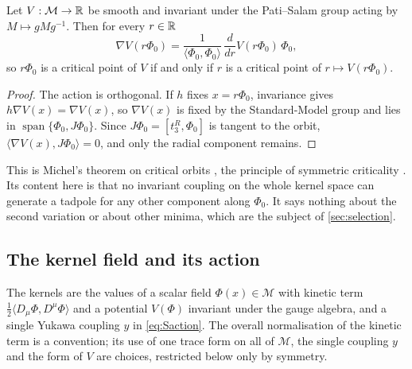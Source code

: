 \begin{theorem}
\label{thm:symcrit}
Let $V:\mathcal M\to\mathbb{R}$ be smooth and invariant under the Pati--Salam group acting by $M\mapsto gMg^{-1}$. Then for every $r\in\mathbb{R}$
\[
\nabla V(r\Phi_0)=\frac1{\langle\Phi_0,\Phi_0\rangle}\,\frac{d}{dr}V(r\Phi_0)\,\Phi_0 ,
\]
so $r\Phi_0$ is a critical point of $V$ if and only if $r$ is a critical point of $r\mapsto V(r\Phi_0)$.
\end{theorem}

\begin{proof}
The action is orthogonal. If $h$ fixes $x=r\Phi_0$, invariance gives $h\nabla V(x)=\nabla V(x)$, so $\nabla V(x)$ is fixed by the Standard-Model
group and lies in $\operatorname{span}\{\Phi_0,J\Phi_0\}$. Since $J\Phi_0=[t^R_3,\Phi_0]$ is tangent to the orbit, $\langle\nabla V(x),J\Phi_0\rangle=0$, and
only the radial component remains.
\end{proof}

This is Michel's theorem on critical orbits \cite{Michel71}, the principle of symmetric criticality \cite{Palais79}. Its content here is that no
invariant coupling on the whole kernel space can generate a tadpole for any other component along $\Phi_0$. It says nothing about the second
variation or about other minima, which are the subject of \cref{sec:selection}.

\subsection{The kernel field and its action}

\begin{assumption}
\label{ass:field}
The kernels are the values of a scalar field $\Phi(x)\in\mathcal M$ with kinetic term $\tfrac12\langle D_\mu\Phi,D^\mu\Phi\rangle$ and a potential $V(\Phi)$
invariant under the gauge algebra, and a single Yukawa coupling $y$ in \eqref{eq:Saction}. The overall normalisation of the kinetic term is a
convention; its use of one trace form on all of $\mathcal M$, the single coupling $y$ and the form of $V$ are choices, restricted below only by symmetry.
\end{assumption}

